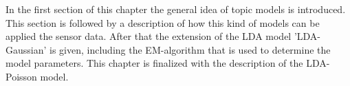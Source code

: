 



In the first section of this chapter the general idea of topic models is introduced. This section is followed by a description of how this kind of models can be applied the sensor data. After that the extension of the LDA model 'LDA-Gaussian' is given, including the EM-algorithm that is used to determine the model parameters. This chapter is finalized with the description of the LDA-Poisson model.

